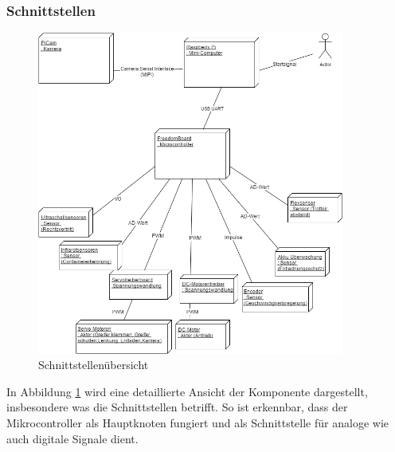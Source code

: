\subsubsection{Schnittstellen}
\begin{figure}[H]%
\centering
\includegraphics[width=0.9\textwidth]{03_Loesungskonzept/pictures/Verteilungsdiagramm.png}
\caption{Schnittstellenübersicht}
\label{fig:Verteilungsdiagramm}
\end{figure}\flushleft
In Abbildung \ref{fig:Verteilungsdiagramm} wird eine detaillierte Ansicht der Komponente dargestellt, insbesondere was die Schnittstellen betrifft. So ist erkennbar, dass der Mikrocontroller als Hauptknoten fungiert und als Schnittstelle für analoge wie auch digitale Signale dient.
